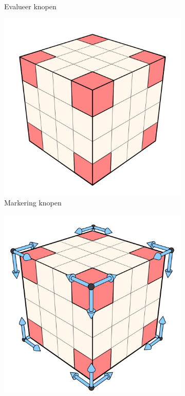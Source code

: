 \begin{figure}[t]
\begin{subfigure}[b]{.3\linewidth}
    \caption{Evalueer knopen}%
    \label{fig:hs-p1d}%
  \end{subfigure}
  \begin{subfigure}[b]{.3\linewidth}
    \includegraphics[width=\textwidth]{./img/raw/hs-slt-algorithm/hs-slt-algorithm-5.png}%
    \caption{Markering knopen}%
    \label{fig:hs-p1e}%
  \end{subfigure}
  \begin{subfigure}[b]{.3\linewidth}
    \includegraphics[width=\textwidth]{./img/raw/hs-slt-algorithm/hs-slt-algorithm-6.png}%

\end{subfigure}
\end{figure}

